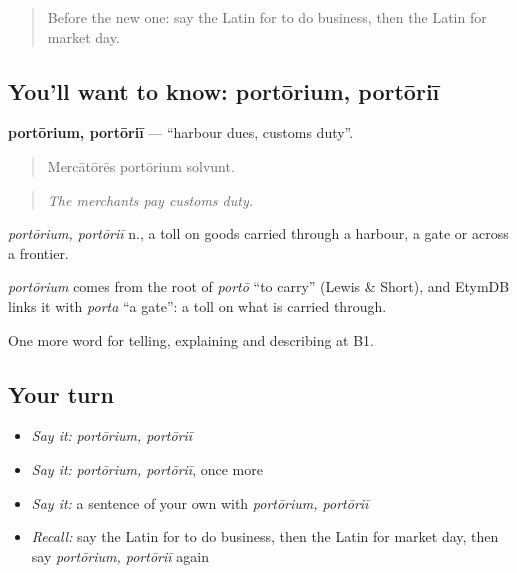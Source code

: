 \label{lesson:LA-C421-portorium}



\begin{quote}
Before the new one: say the Latin for to do business, then the Latin for market day.
\end{quote}

\subsection*{You'll want to know: portōrium, portōriī}
\textbf{portōrium, portōriī} — \textquotedblleft{}harbour dues, customs duty\textquotedblright{}.

\begin{quote}
Mercātōrēs portōrium solvunt.
\end{quote}

\begin{quote}
\emph{The merchants pay customs duty.}
\end{quote}

\emph{portōrium, portōriī} n., a toll on goods carried through a harbour, a gate or across a frontier.

\begin{cousinweb}
\emph{portōrium} comes from the root of \emph{portō} \textquotedblleft{}to carry\textquotedblright{} (Lewis \& Short), and EtymDB links it with \emph{porta} \textquotedblleft{}a gate\textquotedblright{}: a toll on what is carried through.
\end{cousinweb}

\begin{grammarlens}[title={What you've built}]
One more word for telling, explaining and describing at B1.
\end{grammarlens}

\subsection*{Your turn}
\begin{itemize}
\raggedright
  \item \emph{Say it:} \emph{portōrium, portōriī}
  \item \emph{Say it:} \emph{portōrium, portōriī}, once more
  \item \emph{Say it:} a sentence of your own with \emph{portōrium, portōriī}
  \item \emph{Recall:} say the Latin for to do business, then the Latin for market day, then say \emph{portōrium, portōriī} again
\end{itemize}

